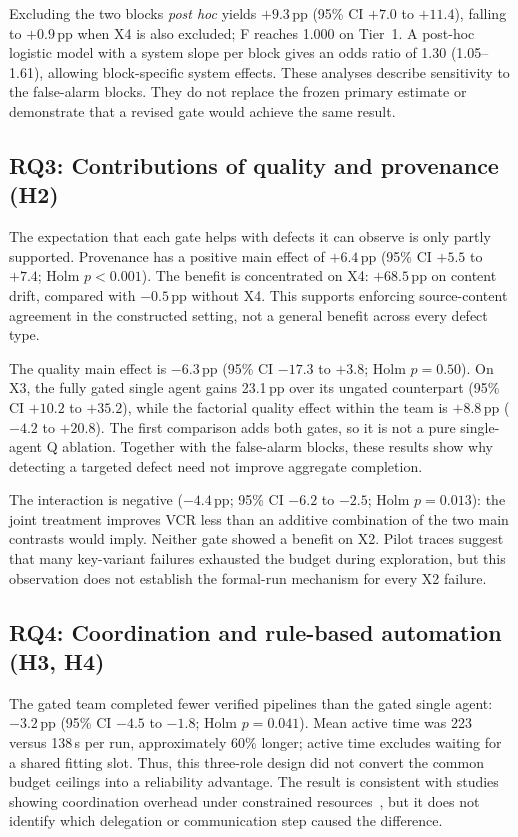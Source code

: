 \documentclass[conference]{IEEEtran}
\newcommand{\sys}[1]{\textsf{#1}}
\begin{document}
Excluding the two blocks \emph{post hoc} yields $+9.3$\,pp (95\% CI $+7.0$ to $+11.4$), falling to $+0.9$\,pp when X4 is also excluded; \sys{F} reaches 1.000 on Tier~1. A post-hoc logistic model with a system slope per block gives an odds ratio of 1.30 (1.05--1.61), allowing block-specific system effects. These analyses describe sensitivity to the false-alarm blocks. They do not replace the frozen primary estimate or demonstrate that a revised gate would achieve the same result.

\subsection{RQ3: Contributions of quality and provenance (H2)}
The expectation that each gate helps with defects it can observe is only partly supported. Provenance has a positive main effect of $+6.4$\,pp (95\% CI $+5.5$ to $+7.4$; Holm $p<0.001$). The benefit is concentrated on X4: $+68.5$\,pp on content drift, compared with $-0.5$\,pp without X4. This supports enforcing source-content agreement in the constructed setting, not a general benefit across every defect type.

The quality main effect is $-6.3$\,pp (95\% CI $-17.3$ to $+3.8$; Holm $p=0.50$). On X3, the fully gated single agent gains 23.1\,pp over its ungated counterpart (95\% CI $+10.2$ to $+35.2$), while the factorial quality effect within the team is $+8.8$\,pp ($-4.2$ to $+20.8$). The first comparison adds both gates, so it is not a pure single-agent Q ablation. Together with the false-alarm blocks, these results show why detecting a targeted defect need not improve aggregate completion.

The interaction is negative ($-4.4$\,pp; 95\% CI $-6.2$ to $-2.5$; Holm $p=0.013$): the joint treatment improves VCR less than an additive combination of the two main contrasts would imply. Neither gate showed a benefit on X2. Pilot traces suggest that many key-variant failures exhausted the budget during exploration, but this observation does not establish the formal-run mechanism for every X2 failure.

\subsection{RQ4: Coordination and rule-based automation (H3, H4)}
The gated team completed fewer verified pipelines than the gated single agent: $-3.2$\,pp (95\% CI $-4.5$ to $-1.8$; Holm $p=0.041$). Mean active time was 223 versus 138\,s per run, approximately 60\% longer; active time excludes waiting for a shared fitting slot. Thus, this three-role design did not convert the common budget ceilings into a reliability advantage. The result is consistent with studies showing coordination overhead under constrained resources~\cite{tran2026single,dylan2026equalcost}, but it does not identify which delegation or communication step caused the difference.
\end{document}
